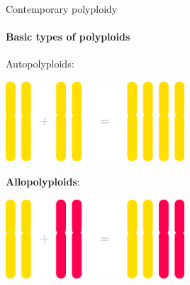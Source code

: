 \documentclass[presentation,sansserif,12pt]{beamer}
\begin{document}

\begin{frame}[t]{Contemporary polyploidy}
\framesubtitle{Basic types of polyploids}

	Autopolyploids:

	\begin{center}
		\includegraphics[width=0.5\textwidth]{eps/autopolyploid-formation}
	\end{center}
	
	\begin{tcolorbox}[colframe=itemcol, colback=white!30!black, coltext=white!95!black]
	\textbf{Allopolyploids}:
	
	\begin{center}
		{\includegraphics[width=0.5\textwidth]{eps/allopolyploid-formation}}
	\end{center}
	\end{tcolorbox}

\end{frame}
\end{document}
